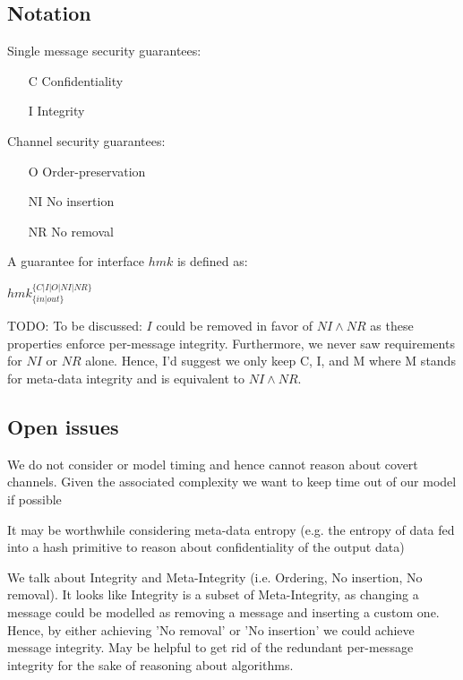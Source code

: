 \documentclass[a4paper,twocolumn]{article}
\newcommand{\TODO}[1]{\small\noindent\color{red} TODO: #1\color{black}}
\begin{document}
\subsection{Notation}

Single message security guarantees:

\begin{itemize}
    \item [C] Confidentiality
    \item [I] Integrity
\end{itemize}

Channel security guarantees:

\begin{itemize}
    \item [O] Order-preservation
    \item [NI] No insertion
    \item [NR] No removal
\end{itemize}

A guarantee for interface $hmk$ is defined as:

$hmk^{\{C|I|O|NI|NR\}}_{\{in|out\}}$

\TODO{To be discussed: $I$ could be removed in favor of $NI \wedge NR$ as these properties enforce per-message integrity. Furthermore, we never saw requirements for $NI$ or $NR$ alone. Hence, I'd suggest we only keep C, I, and M where M stands for meta-data integrity and is equivalent to $NI \wedge NR$.}

\subsection{Open issues}

We do not consider or model timing and hence cannot reason about covert
channels. Given the associated complexity we want to keep time out of our model
if possible

It may be worthwhile considering meta-data entropy (e.g. the entropy of
data fed into a hash primitive to reason about confidentiality of the output
data)

We talk about Integrity and Meta-Integrity (i.e. Ordering, No insertion, No
removal). It looks like Integrity is a subset of Meta-Integrity, as changing a
message could be modelled as removing a message and inserting a custom one.
Hence, by either achieving 'No removal' or 'No insertion' we could achieve
message integrity. May be helpful to get rid of the redundant per-message
integrity for the sake of reasoning about algorithms.
\end{document}
